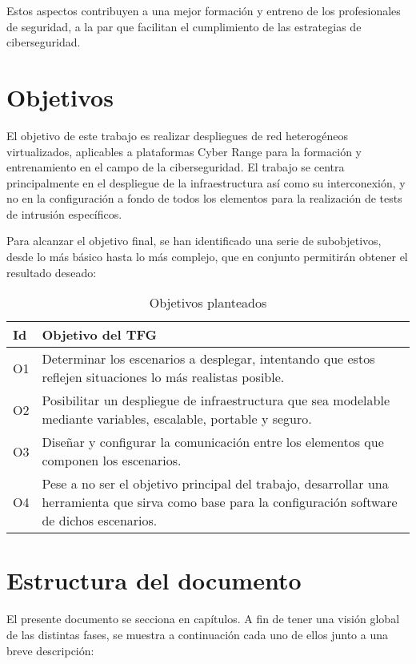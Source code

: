   Estos aspectos contribuyen a una mejor formación y entreno de los profesionales de seguridad, a la par que facilitan el cumplimiento de las estrategias de ciberseguridad.

\section{Objetivos} \label{sec:obj}
  El objetivo de este trabajo es realizar despliegues de red heterogéneos virtualizados, aplicables a plataformas Cyber Range para la formación y entrenamiento en el campo de la ciberseguridad. El trabajo se centra principalmente en el despliegue de la infraestructura así como su interconexión, y no en la configuración a fondo de todos los elementos para la realización de tests de intrusión específicos.

  Para alcanzar el objetivo final, se han identificado una serie de subobjetivos, desde lo más básico hasta lo más complejo, que en conjunto permitirán obtener el resultado deseado:

  \begin{table}[h]
    \begin{center}
      \begin{tabular}{ | w{c}{1cm} | m{14cm} | }
        \hline{} \textbf{Id} & \textbf{Objetivo del TFG} \\ \hline
        O1 & Determinar los escenarios a desplegar, intentando que estos reflejen situaciones lo más realistas posible. \\ \hline{}
        O2 & Posibilitar un despliegue de infraestructura que sea modelable mediante variables, escalable, portable y seguro. \\ \hline
        O3 & Diseñar y configurar la comunicación entre los elementos que componen los escenarios. \\ \hline{}
        O4 & Pese a no ser el objetivo principal del trabajo, desarrollar una herramienta que sirva como base para la configuración software de dichos escenarios. \\ \hline
      \end{tabular}
      \caption{Objetivos planteados}
      \label{tab:objs}
    \end{center}
  \end{table}

\section{Estructura del documento} \label{sec:est}
  El presente documento se secciona en capítulos. A fin de tener una visión global de las distintas fases, se muestra a continuación cada uno de ellos junto a una breve descripción:

